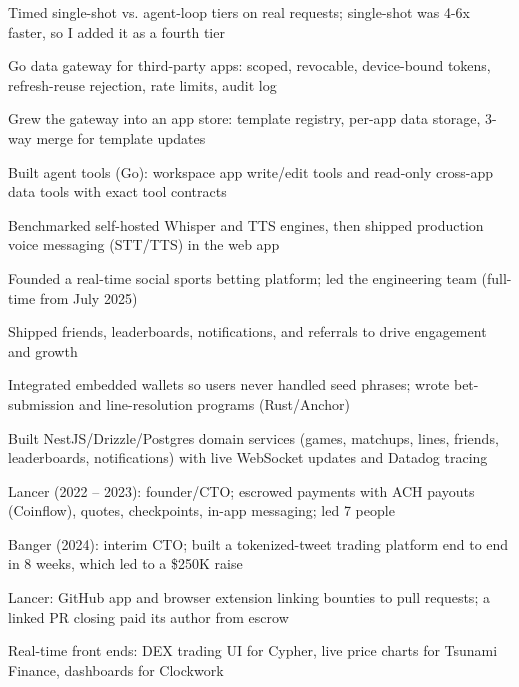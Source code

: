 \documentclass[print]{jack-resume}
\begin{document}
\begin{tightemize}
    \item Timed single-shot vs. agent-loop tiers on real requests; single-shot was 4-6x faster, so I added it as a fourth tier
    \item Go data gateway for third-party apps: scoped, revocable, device-bound tokens, refresh-reuse rejection, rate limits, audit log
    \item Grew the gateway into an app store: template registry, per-app data storage, 3-way merge for template updates
    \item Built agent tools (Go): workspace app write/edit tools and read-only cross-app data tools with exact tool contracts
    \item Benchmarked self-hosted Whisper and TTS engines, then shipped production voice messaging (STT/TTS) in the web app
\end{tightemize}
\sectionsep

\begin{tightemize}
    \item Founded a real-time social sports betting platform; led the engineering team (full-time from July 2025)
    \item Shipped friends, leaderboards, notifications, and referrals to drive engagement and growth
    \item Integrated embedded wallets so users never handled seed phrases; wrote bet-submission and line-resolution programs (Rust/Anchor)
    \item Built NestJS/Drizzle/Postgres domain services (games, matchups, lines, friends, leaderboards, notifications) with live WebSocket updates and Datadog tracing
\end{tightemize}
\sectionsep

\begin{tightemize}
    \item Lancer (2022 -- 2023): founder/CTO; escrowed payments with ACH payouts (Coinflow), quotes, checkpoints, in-app messaging; led 7 people
    \item Banger (2024): interim CTO; built a tokenized-tweet trading platform end to end in 8 weeks, which led to a \$250K raise
    \item Lancer: GitHub app and browser extension linking bounties to pull requests; a linked PR closing paid its author from escrow
    \item Real-time front ends: DEX trading UI for Cypher, live price charts for Tsunami Finance, dashboards for Clockwork
\end{tightemize}
\sectionsep
\end{document}

